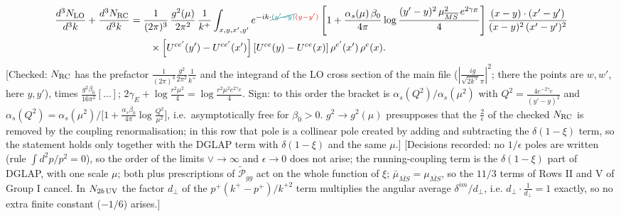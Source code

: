 \documentclass[9pt]{article}
\numberwithin{equation}{section}
\begin{document}
\begin{align}
\frac{d^{3}N_{\rm LO}}{d^{3}k}+\frac{d^{3}N_{\rm RC}}{d^{3}k}&=\frac{1}{(2\pi)^{3}}\,\frac{g^{2}(\mu)}{2\pi^{2}}\,\frac{1}{k^{+}}\int_{x,y,x',y'}e^{-ik\cdot{\color{teal}\cancel{(y'-y)}}{\color{red}(y-y')}}\left[1+\frac{\alpha_{s}(\mu)\,\beta_{0}}{4\pi}\log\frac{(y'-y)^{2}\,\mu^{2}_{\overline{MS}}\,e^{2\gamma_{E}}}{4}\right]\frac{(x-y)\cdot(x'-y')}{(x-y)^{2}\,(x'-y')^{2}}\notag\\
&\qquad\times\left[U^{ce'}(y')-U^{ce'}(x')\right]\left[U^{ce}(y)-U^{ce}(x)\right]\rho^{e'}(x')\,\rho^{e}(x).
\end{align} {\color{red}[Checked: $N_{\rm RC}$ has the prefactor $\frac{1}{(2\pi)^{3}}\frac{g^{2}}{2\pi^{2}}\frac{1}{k^{+}}$ and the integrand of the LO cross section of the main file ($|\frac{ig}{\sqrt{2k^{+}}\pi}|^{2}$; there the points are $w,w'$, here $y,y'$), times $\frac{g^{2}\beta_{0}}{16\pi^{2}}[\dots]$; $2\gamma_{E}+\log\frac{r^{2}\mu^{2}}{4}=\log\frac{r^{2}\mu^{2}e^{2\gamma_{E}}}{4}$. Sign: to this order the bracket is $\alpha_{s}(Q^{2})/\alpha_{s}(\mu^{2})$ with $Q^{2}=\frac{4e^{-2\gamma_{E}}}{(y'-y)^{2}}$ and $\alpha_{s}(Q^{2})=\alpha_{s}(\mu^{2})\big/\big[1+\frac{\alpha_{s}\beta_{0}}{4\pi}\log\frac{Q^{2}}{\mu^{2}}\big]$, i.e.\ asymptotically free for $\beta_{0}>0$. $g^{2}\to g^{2}(\mu)$ presupposes that the $\frac{2}{\epsilon}$ of the checked $N_{\rm RC}$ is removed by the coupling renormalisation; in this row that pole is a collinear pole created by adding and subtracting the $\delta(1-\xi)$ term, so the statement holds only together with the DGLAP term with $\delta(1-\xi)$ and the same $\mu$.]} {\color{red}[Decisions recorded: no $1/\epsilon$ poles are written (rule $\int d^{2}p/p^{2}=0$), so the order of the limits $\vee\to\infty$ and $\epsilon\to0$ does not arise; the running-coupling term is the $\delta(1-\xi)$ part of DGLAP, with one scale $\mu$; both plus prescriptions of $\widetilde{\mathcal{P}}_{gg}$ act on the whole function of $\xi$; $\bar\mu_{\overline{MS}}=\mu_{\overline{MS}}$, so the $11/3$ terms of Rows II and V of Group I cancel. In $N_{2b\,\rm UV}$ the factor $d_{\perp}$ of the $p^{+}(k^{+}-p^{+})/k^{+2}$ term multiplies the angular average $\delta^{im}/d_{\perp}$, i.e. $d_{\perp}\cdot\frac{1}{d_{\perp}}=1$ exactly, so no extra finite constant ($-1/6$) arises.]}\par\noindent
\end{document}
